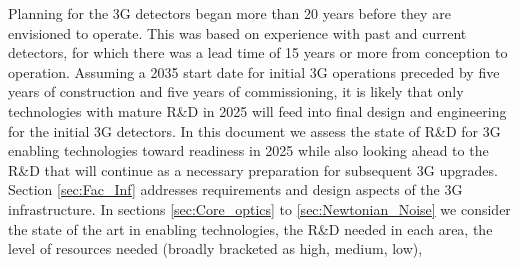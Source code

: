 

Planning for the 3G detectors began more than 20 years before they are envisioned to operate. This was based on experience with past and current detectors, for which there was a lead time of 15 years or more from conception to operation. Assuming a 2035 start date for initial 3G operations preceded by five years of construction and five years of commissioning, it is likely that only technologies with mature R\&D in 2025 will feed into final design and engineering for the initial 3G detectors. In this document we assess the state of R\&D for 3G enabling technologies toward readiness in 2025 while also looking ahead to the R\&D that will continue as a necessary preparation for subsequent 3G upgrades. 
Section \ref{sec:Fac_Inf} addresses requirements and design aspects of the 3G infrastructure.
In sections \ref{sec:Core_optics} to \ref{sec:Newtonian_Noise} we consider the state of the art in enabling technologies, the R\&D needed in each area, the level of resources needed (broadly bracketed as high, medium, low),
